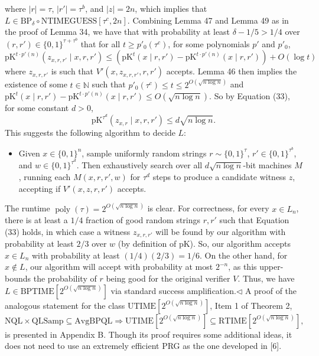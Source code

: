\documentclass[10pt,a4paper]{article}
\begin{document}
where $|r|=\tau$, $|r'|=\tau^b$, and $|z|=2n$, which implies that $L\in\mathrm{BP}_\delta\circ\mathrm{NTIMEGUESS}[\tau^c,2n]$.
Combining Lemma 47 and Lemma 49 as in the proof of Lemma 34, we have that with probability at least $\delta-1/5>1/4$ over $(r,r')\in\{0,1\}^{\tau+\tau^b}$ that for all $t\geq p'_0(\tau^c)$, for some polynomials $p'$ and $p'_0$,
\[\mathrm{pK}^{t\cdot p'(n)}(z_{x,r,r'}\mid x,r,r')\leq(\mathrm{pK}^t(x\mid r,r')-\mathrm{pK}^{t\cdot p'(n)}(x\mid r,r'))+O(\log t)\tag{33}\]
where $z_{x,r,r'}$ is such that $V'(x,z_{x,r,r'},r,r')$ accepts. Lemma 46 then implies the existence of some $t\in\mathbb N$ such that $p'_0(\tau^c)\leq t\leq2^{O(\sqrt{n\log n})}$ and $\mathrm{pK}^t(x\mid r,r')-\mathrm{pK}^{t\cdot p'(n)}(x\mid r,r')\leq O(\sqrt{n\log n})$. So by Equation (33), for some constant $d>0$,
\[\mathrm{pK}^{\tau^d}(z_{x,r}\mid x,r,r')\leq d\sqrt{n\log n}.\]
This suggests the following algorithm to decide $L$:
\begin{itemize}
\item Given $x\in\{0,1\}^n$, sample uniformly random strings $r\sim\{0,1\}^\tau$, $r'\in\{0,1\}^{\tau^b}$, and $w\in\{0,1\}^{\tau^d}$. Then exhaustively search over all $d\sqrt{n\log n}$-bit machines $M$, running each $M(x,r,r',w)$ for $\tau^d$ steps to produce a candidate witness $z$, accepting if $V'(x,z,r,r')$ accepts.
\end{itemize}
The runtime $\operatorname{poly}(\tau)=2^{O(\sqrt{n\log n})}$ is clear. For correctness, for every $x\in L_n$, there is at least a $1/4$ fraction of good random strings $r,r'$ such that Equation (33) holds, in which case a witness $z_{x,r,r'}$ will be found by our algorithm with probability at least $2/3$ over $w$ (by definition of pK). So, our algorithm accepts $x\in L_n$ with probability at least $(1/4)(2/3)=1/6$. On the other hand, for $x\notin L$, our algorithm will accept with probability at most $2^{-n}$, as this upper-bounds the probability of $r$ being good for the original verifier $V$. Thus, we have $L\in\mathrm{BPTIME}[2^{O(\sqrt{n\log n})}]$ via standard success amplification.\hfill$\triangleleft$
A proof of the analogous statement for the class $\mathrm{UTIME}[2^{O(\sqrt{n\log n})}]$, Item 1 of Theorem 2,
\[\mathrm{NQL}\times\mathrm{QLSamp}\subseteq\mathrm{AvgBPQL}\Longrightarrow\mathrm{UTIME}[2^{O(\sqrt{n\log n})}]\subseteq\mathrm{RTIME}[2^{O(\sqrt{n\log n})}],\]
is presented in Appendix B. Though its proof requires some additional ideas, it does not need to use an extremely efficient PRG as the one developed in [6].
\end{document}
